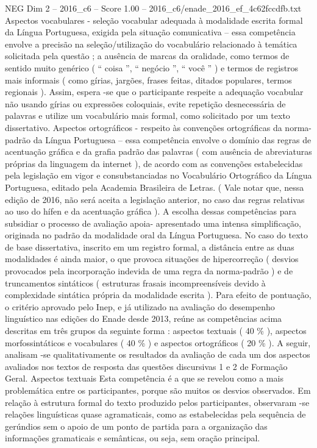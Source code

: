 \begin{textsample}{NEG Dim 2 – 2016\_c6 – Score 1.00 – 2016\_c6/enade\_2016\_ef\_4c62fccdfb.txt}
Aspectos vocabulares - seleção vocabular adequada à modalidade escrita formal da Língua Portuguesa, exigida pela situação comunicativa – essa competência envolve a precisão na seleção/utilização do vocabulário relacionado à temática solicitada pela questão ; a ausência de marcas da oralidade, como termos de sentido muito genérico ( “ coisa ”, “ negócio ”, “ você ” ) e termos de registros mais informais ( como gírias, jargões, frases feitas, ditados populares, termos regionais ).
Assim, espera -se que o participante respeite a adequação vocabular não usando gírias ou expressões coloquiais, evite repetição desnecessária de palavras e utilize um vocabulário mais formal, como solicitado por um texto dissertativo.
Aspectos ortográficos - respeito às convenções ortográficas da norma-padrão da Língua Portuguesa – essa competência envolve o domínio das regras de acentuação gráfica e da grafia padrão das palavras ( com ausência de abreviaturas próprias da linguagem da internet ), de acordo com as convenções estabelecidas pela legislação em vigor e consubstanciadas no Vocabulário Ortográfico da Língua Portuguesa, editado pela Academia Brasileira de Letras. ( Vale notar que, nessa edição de 2016, não será aceita a legislação anterior, no caso das regras relativas ao uso do hífen e da acentuação gráfica ).
A escolha dessas competências para subsidiar o processo de avaliação apoia- apresentado uma intensa simplificação, originada no padrão da modalidade oral da Língua Portuguesa.
No caso do texto de base dissertativa, inscrito em um registro formal, a distância entre as duas modalidades é ainda maior, o que provoca situações de hipercorreção ( desvios provocados pela incorporação indevida de uma regra da norma-padrão ) e de truncamentos sintáticos ( estruturas frasais incompreensíveis devido à complexidade sintática própria da modalidade escrita ).
Para efeito de pontuação, o critério aprovado pelo Inep, e já utilizado na avaliação do desempenho linguístico nas edições do Enade desde 2013, reúne as competências acima descritas em três grupos da seguinte forma : aspectos textuais ( 40 \% ), aspectos morfossintáticos e vocabulares ( 40 \% ) e aspectos ortográficos ( 20 \% ).
A seguir, analisam -se qualitativamente os resultados da avaliação de cada um dos aspectos avaliados nos textos de resposta das questões discursivas 1 e 2 de Formação Geral.
Aspectos textuais Esta competência é a que se revelou como a mais problemática entre os participantes, porque são muitos os desvios observados.
Em relação à estrutura formal do texto produzido pelos participantes, observaram -se relações linguísticas quase agramaticais, como as estabelecidas pela sequência de gerúndios sem o apoio de um ponto de partida para a organização das informações gramaticais e semânticas, ou seja, sem oração principal.

\end{textsample}
